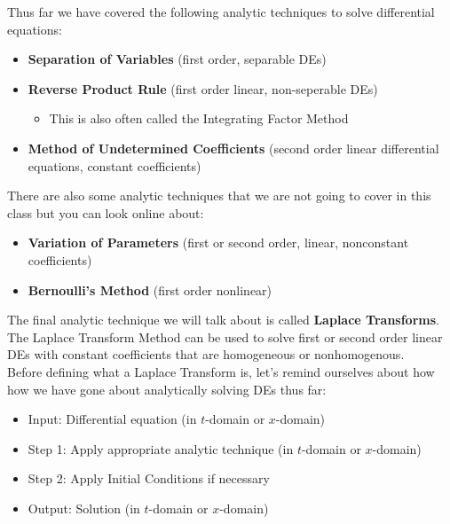 \pagestyle{fancy}
\renewcommand{\theUnit}{15}
\ifthenelse{\isundefined{\UnitPageNumbers}}{}{\setcounter{page}{1}}
\rhead{Unit \theUnit: Laplace Transforms}
\rfoot{\mypage}
\lfoot{}
\cfoot{}
\renewcommand{\footrulewidth}{.4pt}
\vspace*{-20pt} \thispagestyle{firstfooter}

Thus far we have covered the following analytic techniques to solve differential equations:
\begin{itemize} \itemsep-2pt
\item \textbf{Separation of Variables} (first order, separable DEs)
\item \textbf{Reverse Product Rule} (first order linear, non-seperable DEs)
\begin{itemize} \itemsep-2pt
\item This is also often called the Integrating Factor Method
\end{itemize}
\item \textbf{Method of Undetermined Coefficients} (second order linear differential equations, constant coefficients)
\end{itemize}

There are also some analytic techniques that we are not going to cover in this class but you can look online about:
\begin{itemize} \itemsep-2pt
\item \textbf{Variation of Parameters} (first or second order, linear, nonconstant coefficients)
\item \textbf{Bernoulli's Method} (first order nonlinear)
\end{itemize}

The final analytic technique we will talk about is called \textbf{Laplace Transforms}. The Laplace Transform Method can be used to solve first or second order linear DEs with constant coefficients that are homogeneous or nonhomogenous. \\

Before defining what a Laplace Transform is, let's remind ourselves about how how we have gone about analytically solving DEs thus far:
\begin{itemize} \itemsep-2pt
\item Input: Differential equation (in $t$-domain or $x$-domain)
\item Step 1: Apply appropriate analytic technique (in $t$-domain or $x$-domain)
\item Step 2: Apply Initial Conditions if necessary
\item Output: Solution (in $t$-domain or $x$-domain)
\end{itemize}

